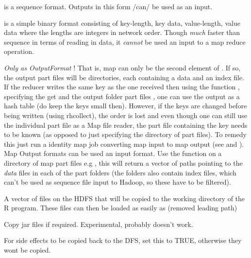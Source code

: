 \documentclass[letterpaper,10pt,english]{sphinxmanual}
\begin{document}
\begin{description}
\begin{description}
\begin{description}
\end{description}

\item[{\code{sequence}}] \leavevmode
is a sequence format. Outputs in this form /can/ be used as an input.

\item[{\code{binary}}] \leavevmode
is a simple binary format consisting of key-length, key data, value-length, value data where the lengths are integers in network order. Though \emph{much} faster than sequence in terms of reading in data, it \emph{cannot} be used an input to a map reduce operation.

\item[{\code{map}}] \leavevmode
\emph{Only as OutputFormat} ! That is, map can only be the second element of . If so, the output part files will be directories, each containing a data and an index file. If the reducer writes the same key as the one received then using the function , specifying the get and the output folder part files , one can use the output as a hash table (do keep the keys small then). However, if the keys are changed before being written (using rhcollect), the order is lost and even though one can still use the individual part file as a Map file reader, the part file containing the key needs to be known (as opposed to just specifying the directory of part files). To remedy this just run a identity map job converting map input to map output (see  and ).
Map Output formats can be used an input format. Use the function  on a directory of map part files e.g , this will return a vector of paths pointing to the \emph{data} files in each of the part folders (the folders also contain index files, which can't be used as sequence file input to Hadoop, so these have to be filtered).

\item[{\code{shared}}] \leavevmode
A vector of files on the HDFS that will be copied to the working directory of the R program. These files can then be loaded as easily as  (removed leading path)

\end{description}

\item[{\code{jarfiles}}] \leavevmode
Copy jar files if required. Experimental, probably doesn't work.

\item[{\code{copyFiles}}] \leavevmode
For side effects to be copied back to the DFS, set this to TRUE, otherwise they wont be copied.


\end{description}
\end{document}
